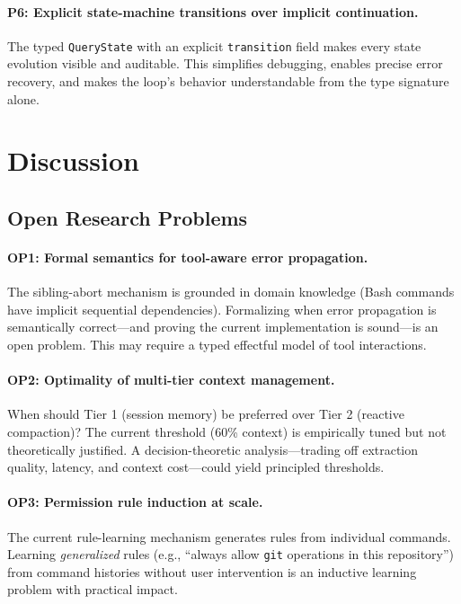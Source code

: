 \documentclass{article}
\newcommand{\code}[1]{\texttt{#1}}
\begin{document}
\paragraph{P6: Explicit state-machine transitions over implicit continuation.}
The typed \code{QueryState} with an explicit \code{transition} field makes every state evolution visible and auditable. This simplifies debugging, enables precise error recovery, and makes the loop's behavior understandable from the type signature alone.

\section{Discussion}
\label{sec:discussion}

\subsection{Open Research Problems}

\paragraph{OP1: Formal semantics for tool-aware error propagation.}
The sibling-abort mechanism is grounded in domain knowledge (Bash commands have implicit sequential dependencies). Formalizing when error propagation is semantically correct---and proving the current implementation is sound---is an open problem. This may require a typed effectful model of tool interactions.

\paragraph{OP2: Optimality of multi-tier context management.}
When should Tier 1 (session memory) be preferred over Tier 2 (reactive compaction)? The current threshold (60\% context) is empirically tuned but not theoretically justified. A decision-theoretic analysis---trading off extraction quality, latency, and context cost---could yield principled thresholds.

\paragraph{OP3: Permission rule induction at scale.}
The current rule-learning mechanism generates rules from individual commands. Learning \emph{generalized} rules (e.g., ``always allow \code{git} operations in this repository'') from command histories without user intervention is an inductive learning problem with practical impact.
\end{document}
